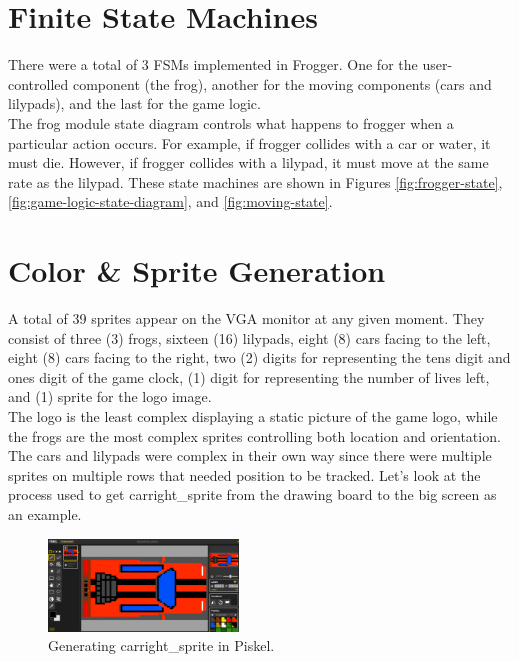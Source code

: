 \documentclass[journal, twocolumn, final,11pt,letterpaper]{IEEEtran}
\begin{document}
\section{Finite State Machines}
There were a total of 3 FSMs implemented in Frogger. One for the user-controlled component (the frog), another for the moving components (cars and lilypads), and the last for the game logic.\\ 

The frog module state diagram controls what happens to frogger when a particular action occurs. For example, if frogger collides with a car or water, it must die. However, if frogger collides with a lilypad, it must move at the same rate as the lilypad. These state machines are shown in Figures \ref{fig:frogger-state}, \ref{fig:game-logic-state-diagram}, and \ref{fig:moving-state}.


\section{Color \& Sprite Generation}
A total of 39 sprites appear on the VGA monitor at any given moment.  They consist of three (3) frogs, sixteen (16) lilypads, eight (8) cars facing to the left, eight (8) cars facing to the right, two (2) digits for representing the tens digit and ones digit of the game clock, (1) digit for representing the number of lives left, and (1) sprite for the logo image.  \\

The logo is the least complex displaying a static picture of the game logo, while the frogs are the most complex sprites controlling both location and orientation. The cars and lilypads were complex in their own way since there were multiple sprites on multiple rows that needed position to be tracked.  Let's look at the process used to get carright\_sprite from the drawing board to the big screen as an example. 

	\begin{figure}[H]
		\centering
		\includegraphics[width=0.45\textwidth]{piskel.png}
		\caption{Generating carright\_sprite in Piskel.}
		\label{fig:piskel}
	\end{figure}  
\end{document}
